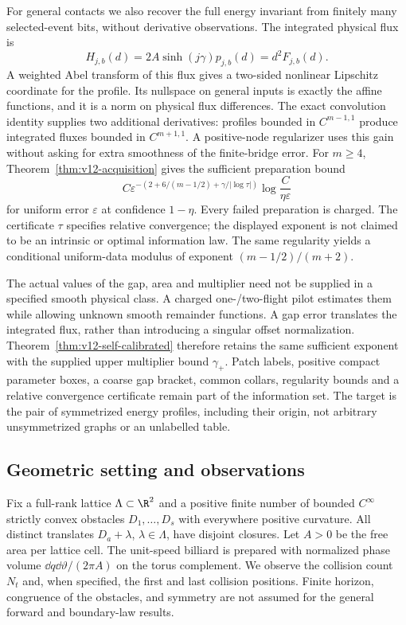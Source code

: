 For general contacts we also recover the full energy invariant from
finitely many selected-event bits, without derivative observations.
The integrated physical flux is
\[
 H_{j,b}(d)=2A\sinh(j\gamma)p_{j,b}(d)=d^2F_{j,b}(d).
\]
A weighted Abel transform of this flux gives a two-sided nonlinear
Lipschitz coordinate for the profile. Its nullspace on general inputs
is exactly the affine functions, and it is a norm on physical flux
differences. The exact convolution identity supplies two additional
derivatives: profiles bounded in $C^{m-1,1}$ produce integrated
fluxes bounded in $C^{m+1,1}$. A positive-node regularizer uses this
gain without asking for extra smoothness of the finite-bridge error.
For $m\ge4$, Theorem~\ref{thm:v12-acquisition} gives the sufficient
preparation bound
\[
 C\varepsilon^{-\left(2+6/(m-1/2)+\gamma/|\log\tau|\right)}
                         \log\frac{C}{\eta\varepsilon}
\]
for uniform error $\varepsilon$ at confidence $1-\eta$.
Every failed preparation is charged. The certificate $\tau$ specifies
relative convergence; the displayed exponent is not claimed to be an
intrinsic or optimal information law. The same regularity yields a
conditional uniform-data modulus of exponent $(m-1/2)/(m+2)$.

The actual values of the gap, area and multiplier need not be supplied
in a specified smooth physical class. A charged one-/two-flight pilot
estimates them while allowing unknown smooth remainder functions.
A gap error translates the integrated flux, rather than introducing
a singular offset normalization. Theorem~\ref{thm:v12-self-calibrated}
therefore retains the same sufficient exponent with the supplied upper
multiplier bound $\gamma_+$. Patch labels, positive compact parameter
boxes, a coarse gap bracket, common collars, regularity bounds and a
relative convergence certificate remain part of the information set.
The target is the pair of symmetrized energy profiles, including their
origin, not arbitrary unsymmetrized graphs or an unlabelled table.

\subsection{Geometric setting and observations}
Fix a full-rank lattice $\Lambda\subset\R^2$ and a positive finite number of bounded
$C^\infty$ strictly convex obstacles $D_1,\ldots,D_s$ with everywhere
positive curvature. All distinct translates $D_a+\lambda$, $\lambda\in
\Lambda$, have disjoint closures. Let $A>0$ be the free area per lattice
cell. The unit-speed billiard is prepared with normalized phase volume
$\dd q\dd\vartheta/(2\pi A)$ on the torus complement. We observe the
collision count $N_t$ and, when specified, the first and last collision
positions. Finite horizon, congruence of the obstacles, and symmetry
are not assumed for the general forward and boundary-law results.

